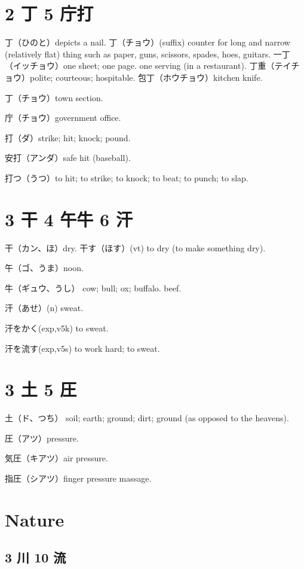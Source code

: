 \section{2 丁 5 庁打}

丁（ひのと）depicts a nail.
丁（チョウ）(suffix)
counter for long and narrow (relatively flat) thing
such as paper, guns, scissors, spades, hoes, guitars.
一丁（イッチョウ）one sheet; one page.
one serving (in a restaurant).
丁重（テイチョウ）polite; courteous; hospitable.
包丁（ホウチョウ）kitchen knife.

丁（チョウ）town section.

庁（チョウ）government office.

打（ダ）strike; hit; knock; pound.

安打（アンダ）safe hit (baseball).

打つ（うつ）to hit; to strike; to knock; to beat; to punch; to slap.

\section{3 干 4 午牛 6 汗}

干（カン、ほ）dry.
干す（ほす）(vt) to dry (to make something dry).

午（ゴ、うま）noon.

牛（ギュウ、うし）
cow; bull; ox; buffalo.
beef.

汗（あせ）(n) sweat.

汗をかく(exp,v5k) to sweat.

汗を流す(exp,v5s) to work hard; to sweat.

\section{3 土 5 圧}

土（ド、つち）
soil; earth; ground; dirt; ground (as opposed to the heavens).

圧（アツ）pressure.

気圧（キアツ）air pressure.

指圧（シアツ）finger pressure massage.

\section{Nature}

\subsection{3 川 10 流}

